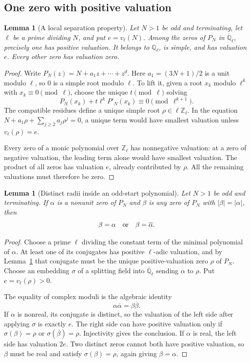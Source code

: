 \documentclass[11pt,a4paper]{article}
\newtheorem{lemma}[theorem]{Lemma}
\theoremstyle{definition}
\theoremstyle{remark}
\numberwithin{equation}{section}
\begin{document}
\subsection{One zero with positive valuation}

\begin{lemma}[A local separation property]
\label{C:lem:odd-local-zero}
Let $N>1$ be odd and terminating, let $\ell$ be a prime dividing $N$,
and put $e=v_\ell(N)$. Among the zeros of $P_N$ in
$\overline{\mathbb Q}_\ell$, precisely one has positive valuation.
It belongs to $\mathbb Q_\ell$, is simple, and has valuation $e$.
Every other zero has valuation zero.
\end{lemma}

\begin{proof}
Write $P_N(z)=N+a_1z+\cdots+z^d$. Here
$a_1=(3N+1)/2$ is a unit modulo $\ell$, so $0$ is a simple root modulo
$\ell$. To lift it, given a root $x_k$ modulo $\ell^k$ with
$x_k\equiv0\pmod\ell$, choose the unique $t\pmod\ell$ solving
\[
 P_N(x_k)+t\ell^kP'_N(x_k)\equiv0\pmod{\ell^{k+1}}.
\]
The compatible residues define a unique simple root
$\rho\in\ell\mathbb Z_\ell$.
In the equation $N+a_1\rho+\sum_{j\geq2}a_j\rho^j=0$, a unique term
would have smallest valuation unless $v_\ell(\rho)=e$.

Every zero of a monic polynomial over $\mathbb Z_\ell$ has nonnegative
valuation: at a zero of negative valuation, the leading term alone
would have smallest valuation. The product of all zeros has valuation
$e$, already contributed by $\rho$. All the remaining valuations must
therefore be zero.
\end{proof}

\begin{lemma}[Distinct radii inside an odd-start polynomial]
\label{C:lem:odd-radii}
Let $N>1$ be odd and terminating. If $\alpha$ is a nonunit zero of
$P_N$ and $\beta$ is any zero of $P_N$ with $|\beta|=|\alpha|$, then
\[
 \beta=\alpha\quad\hbox{or}\quad\beta=\overline\alpha.
\]
\end{lemma}

\begin{proof}
Choose a prime $\ell$ dividing the constant term of the minimal
polynomial of $\alpha$. At least one of its conjugates has positive
$\ell$-adic valuation, and by Lemma~\ref{C:lem:odd-local-zero} that
conjugate must be the unique positive-valuation zero $\rho$ of $P_N$.
Choose an embedding $\sigma$ of a splitting field into
$\overline{\mathbb Q}_\ell$ sending $\alpha$ to $\rho$.
Put $e=v_\ell(\rho)>0$.

The equality of complex moduli is the algebraic identity
\[
 \alpha\overline\alpha=\beta\overline\beta.
\]
If $\alpha$ is nonreal, its conjugate is distinct, so the valuation of
the left side after applying $\sigma$ is exactly $e$. The right side
can have positive valuation only if $\sigma(\beta)=\rho$ or
$\sigma(\overline\beta)=\rho$. Injectivity gives the conclusion.
If $\alpha$ is real, the left side has valuation $2e$. Two distinct
zeros cannot both have positive valuation, so $\beta$ must be real
and satisfy $\sigma(\beta)=\rho$, again giving $\beta=\alpha$.
\end{proof}
\end{document}
